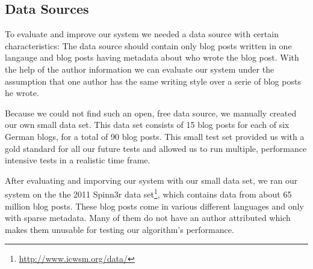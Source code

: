 
\subsection{Data Sources}
\label{sec:data_sources}


To evaluate and improve our system we needed a data source with certain characteristics:
The data source should contain only blog posts written in one langauge and blog posts having metadata about who wrote the blog post.
With the help of the author information we can evaluate our system under the assumption that one author has the same writing style over a serie of blog posts he wrote.

Because we could not find such an open, free data source, we manually created our own small data set.
This data set consists of 15 blog posts for each of six German blogs, for a total of 90 blog posts.
This small test set provided us with a gold standard for all our future tests and allowed us to run multiple, performance intensive tests in a realistic time frame.

After evaluating and imporving our system with our small data set, we ran our system on the the 2011 Spinn3r data set\footnote{\url{http://www.icwsm.org/data/}}, which contains data from about 65 million blog posts.
These blog posts come in various different languages and only with sparse metadata.
Many of them do not have an author attributed which makes them unusable for testing our algorithm's performance.



